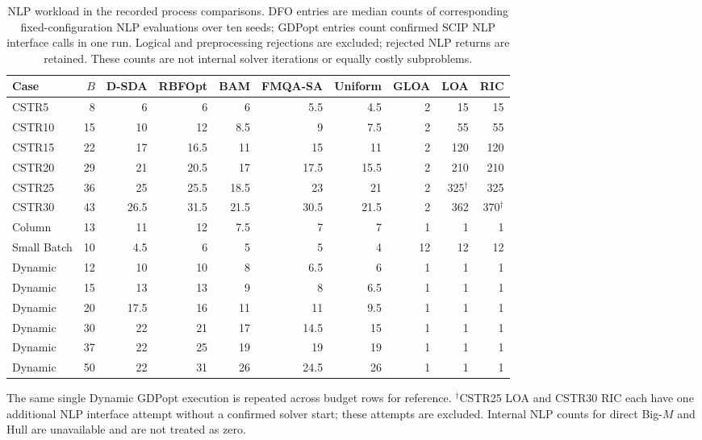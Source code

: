 \begin{table}[htbp]\centering\small
\caption{NLP workload in the recorded process comparisons.
DFO entries are median counts of corresponding fixed-configuration NLP evaluations over ten seeds; GDPopt entries count confirmed SCIP NLP interface calls in one run.
Logical and preprocessing rejections are excluded; rejected NLP returns are retained.
These counts are not internal solver iterations or equally costly subproblems.}
\label{tab:joint-nlp-workload}
\setlength{\tabcolsep}{3.5pt}
\begin{tabular}{lrrrrrrrrr}\toprule
Case & \(B\) & D-SDA & RBFOpt & BAM & FMQA-SA & Uniform & GLOA & LOA & RIC\\\midrule
CSTR5 & 8 & 6 & 6 & 6 & 5.5 & 4.5 & 2 & 15 & 15 \\
CSTR10 & 15 & 10 & 12 & 8.5 & 9 & 7.5 & 2 & 55 & 55 \\
CSTR15 & 22 & 17 & 16.5 & 11 & 15 & 11 & 2 & 120 & 120 \\
CSTR20 & 29 & 21 & 20.5 & 17 & 17.5 & 15.5 & 2 & 210 & 210 \\
CSTR25 & 36 & 25 & 25.5 & 18.5 & 23 & 21 & 2 & 325\(^{\dagger}\) & 325 \\
CSTR30 & 43 & 26.5 & 31.5 & 21.5 & 30.5 & 21.5 & 2 & 362 & 370\(^{\dagger}\) \\
Column & 13 & 11 & 12 & 7.5 & 7 & 7 & 1 & 1 & 1 \\
Small Batch & 10 & 4.5 & 6 & 5 & 5 & 4 & 12 & 12 & 12 \\
Dynamic & 12 & 10 & 10 & 8 & 6.5 & 6 & 1 & 1 & 1 \\
Dynamic & 15 & 13 & 13 & 9 & 8 & 6.5 & 1 & 1 & 1 \\
Dynamic & 20 & 17.5 & 16 & 11 & 11 & 9.5 & 1 & 1 & 1 \\
Dynamic & 30 & 22 & 21 & 17 & 14.5 & 15 & 1 & 1 & 1 \\
Dynamic & 37 & 22 & 25 & 19 & 19 & 19 & 1 & 1 & 1 \\
Dynamic & 50 & 22 & 31 & 26 & 24.5 & 26 & 1 & 1 & 1 \\
\bottomrule\end{tabular}
\par\smallskip
\begin{minipage}{0.98\linewidth}\footnotesize
The same single Dynamic GDPopt execution is repeated across budget rows for reference.
\(^{\dagger}\)CSTR25 LOA and CSTR30 RIC each have one additional NLP interface attempt without a confirmed solver start; these attempts are excluded.
Internal NLP counts for direct Big-\(M\) and Hull are unavailable and are not treated as zero.
\end{minipage}
\end{table}
\FloatBarrier

